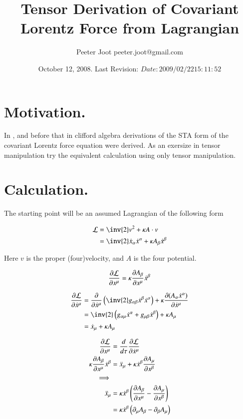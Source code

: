 \documentclass{article}
\title{Tensor Derivation of Covariant Lorentz Force from Lagrangian}
\author{Peeter Joot \quad peeter.joot@gmail.com}
\date{ October 12, 2008.  Last Revision: $Date: 2009/02/22 15:11:52 $ }
\begin{document}
\maketitle{}

\tableofcontents

\section{ Motivation. }

In \cite{PJSrLorentzForce}, and before that in \cite{PJSrLagrangian} clifford
algebra derivations of the STA form of the covariant Lorentz force equation
were derived.  As an exersize in tensor manipulation try the equivalent
calculation using only tensor manipulation.

\section{ Calculation. }

The starting point will be an assumed Lagrangian of the following form

\begin{align}\label{eqn:lagrangian}
\LL &= \inv{2} v^2 + \kappa A \cdot v \\
&= \inv{2} \xdot_\alpha \xdot^\alpha + \kappa A_\beta \xdot^\beta
\end{align}

Here $v$ is the proper (four)velocity, and $A$ is the four potential.

\begin{align*}
\PD{x^\mu}{\LL} = \kappa \PD{x^\mu}{A_\beta} \xdot^\beta
\end{align*}

\begin{align*}
\PD{\xdot^\mu}{\LL}
&= \PD{\xdot^\mu}{} \left( \inv{2} g_{\alpha\beta} \xdot^\beta \xdot^\alpha \right) + \kappa \PD{\xdot^\mu}{(A_\alpha \xdot^\alpha)} \\
&= \inv{2} \left( g_{\alpha\mu} \xdot^\alpha +g_{\mu\beta} \xdot^\beta \right) + \kappa A_\mu \\
&= \xdot_\mu + \kappa A_\mu \\
\end{align*}

\begin{align*}
\PD{x^\mu}{\LL} &= \frac{d}{d\tau} \PD{\xdot^\mu}{\LL} \\
\kappa \PD{x^\mu}{A_\beta} \xdot^\beta &= \xddot_\mu + \kappa \xdot^\beta \PD{x^\beta}{A_\mu} \\
\implies \\
\xddot_\mu
&= \kappa \xdot^\beta \left( \PD{x^\mu}{A_\beta} - \PD{x^\beta}{A_\mu} \right) \\
&= \kappa \xdot^\beta \left( \partial_\mu {A_\beta} - \partial_{\beta}{A_\mu} \right) \\
\end{align*}
\end{document}
